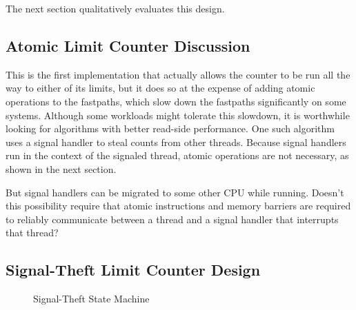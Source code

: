 The next section qualitatively evaluates this design.

\subsection{Atomic Limit Counter Discussion}

This is the first implementation that actually allows the counter to
be run all the way to either of its limits, but it does so at the
expense of adding atomic operations to the fastpaths, which slow down
the fastpaths significantly on some systems.
Although some workloads might tolerate this slowdown, it is worthwhile
looking for algorithms with better read-side performance.
One such algorithm uses a signal handler to steal counts from other
threads.
Because signal handlers run in the context of the signaled thread,
atomic operations are not necessary, as shown in the next section.

\QuickQuiz{}
	But signal handlers can be migrated to some other
	CPU while running.
	Doesn't this possibility require that atomic instructions
	and memory barriers are required to reliably communicate
	between a thread and a signal handler that interrupts that
	thread?
 \QuickQuizEnd

\subsection{Signal-Theft Limit Counter Design}
\label{sec:count:Signal-Theft Limit Counter Design}

\begin{figure}[tb]
\centering
{}
\caption{Signal-Theft State Machine}
\label{fig:count:Signal-Theft State Machine}
\end{figure}

